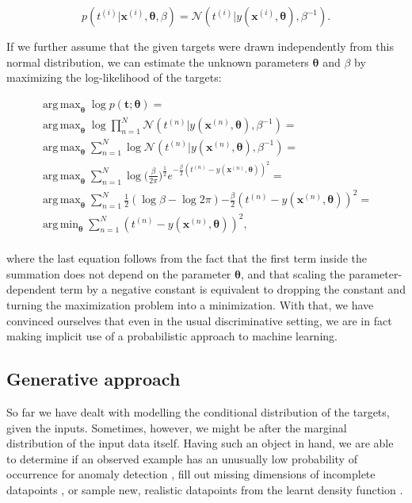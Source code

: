 \documentclass{report}
\DeclareMathOperator*{\argmax}{arg\,max}
\DeclareMathOperator*{\argmin}{arg\,min}
\begin{document}
\[ p(t^{(i)}|\boldsymbol{x}^{(i)}, \boldsymbol{\theta}, \beta)  = \mathcal{N} (t^{(i)} | y(\boldsymbol{x}^{(i)}, \boldsymbol{\theta}), \beta^{-1}). \]

\noindent If we further assume that the given targets were drawn independently from this normal distribution, we can estimate the unknown parameters $\boldsymbol{\theta}$ and $\beta$ by maximizing the log-likelihood of the targets:

\begin{equation}
\begin{gathered}
\argmax_{\boldsymbol{\theta}} \log p(\mathbf{t}; \boldsymbol{\theta}) = \\
\argmax_{\boldsymbol{\theta}} \log \prod_{n=1}^N \mathcal{N}(t^{(n)} | y(\boldsymbol{x}^{(n)}, \boldsymbol{\theta}), \beta^{-1}) = \\
\argmax_{\boldsymbol{\theta}} \sum_{n=1}^N \log \mathcal{N}(t^{(n)} | y(\boldsymbol{x}^{(n)}, \boldsymbol{\theta}), \beta^{-1}) = \\
\argmax_{\boldsymbol{\theta}} \sum_{n=1}^N \log \Big(\frac{\beta}{2 \pi}\Big)^{\frac{1}{2}} e^{-\frac{\beta}{2} (t^{(n)} - y(\boldsymbol{x}^{(n)}, \boldsymbol{\theta}))^2} = \\
\argmax_{\boldsymbol{\theta}} \sum_{n=1}^N \frac{1}{2} (\log \beta - \log 2 \pi) {-\frac{\beta}{2} (t^{(n)} - y(\boldsymbol{x}^{(n)}, \boldsymbol{\theta}))^2} = \\
\argmin_{\boldsymbol{\theta}} \sum_{n=1}^N (t^{(n)} - y(\boldsymbol{x}^{(n)}, \boldsymbol{\theta}))^2,
\end{gathered} 
\label{eq:mse-deriv}
\end{equation} \\

\noindent where the last equation follows from the fact that the first term inside the summation does not depend on the parameter $\boldsymbol{\theta}$, and that scaling the parameter-dependent term by a negative constant is equivalent to dropping the constant and turning the maximization problem into a minimization. With that, we have convinced ourselves that even in the usual discriminative setting, we are in fact making implicit use of a probabilistic approach to machine learning. \\

\subsection{Generative approach}

\noindent So far we have dealt with modelling the conditional distribution of the targets, given the inputs. Sometimes, however, we might be after the marginal distribution of the input data itself. Having such an object in hand, we are able to determine if an observed example has an unusually low probability of occurrence for anomaly detection \cite{vae-anomaly}, fill out missing dimensions of incomplete datapoints \cite{missing-data}, or sample new, realistic datapoints from the learnt density function \cite{vaegan}.  \\
\end{document}
